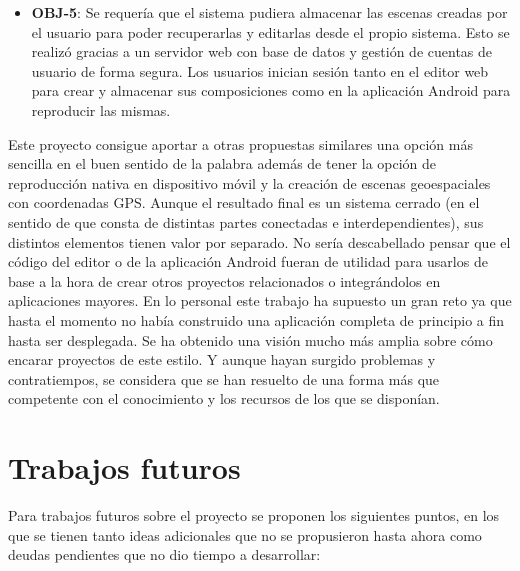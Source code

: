 \begin{itemize}
    \item \textbf{OBJ-5}: Se requería que el sistema pudiera almacenar las escenas creadas por el usuario para poder recuperarlas y editarlas desde el propio sistema. Esto se realizó gracias a un servidor web con base de datos y gestión de cuentas de usuario de forma segura. Los usuarios inician sesión tanto en el editor web para crear y almacenar sus composiciones como en la aplicación Android para reproducir las mismas.
\end{itemize}

Este proyecto consigue aportar a otras propuestas similares una opción más sencilla en el buen sentido de la palabra además de tener la opción de reproducción nativa en dispositivo móvil y la creación de escenas geoespaciales con coordenadas GPS. Aunque el resultado final es un sistema cerrado (en el sentido de que consta de distintas partes conectadas e interdependientes), sus distintos elementos tienen valor por separado. No sería descabellado pensar que el código del editor o de la aplicación Android fueran de utilidad para usarlos de base a la hora de crear otros proyectos relacionados o integrándolos en aplicaciones mayores. En lo personal este trabajo ha supuesto un gran reto ya que hasta el momento no había construido una aplicación completa de principio a fin hasta ser desplegada. Se ha obtenido una visión mucho más amplia sobre cómo encarar proyectos de este estilo. Y aunque hayan surgido problemas y contratiempos, se considera que se han resuelto de una forma más que competente con el conocimiento y los recursos de los que se disponían.

\section{Trabajos futuros}

Para trabajos futuros sobre el proyecto se proponen los siguientes puntos, en los que se tienen tanto ideas adicionales que no se propusieron hasta ahora como deudas pendientes que no dio tiempo a desarrollar:

